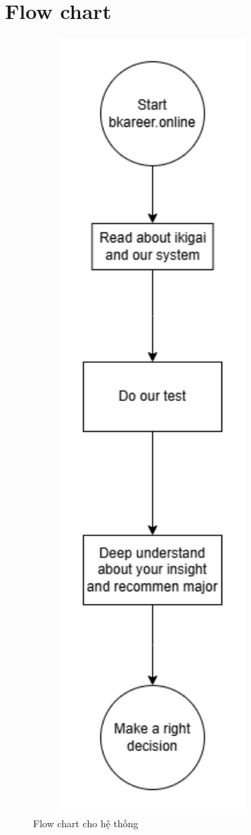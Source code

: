 \newpage 

\section{Flow chart}
\begin{figure}
\centering
\includegraphics[width=0.8\textwidth]{images/flowchart.png}
\vspace{0.5cm}
\caption{Flow chart cho hệ thống }
\end{figure}

